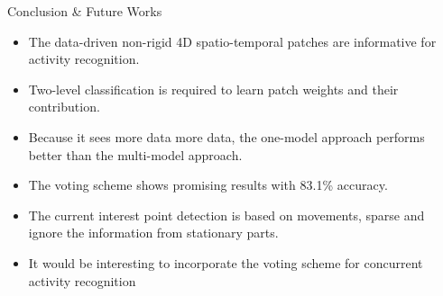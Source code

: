 \documentclass[final,hyperref={pdfpagelabels=false}]{beamer}
\begin{document}
\begin{frame}[t]
\begin{columns}[t]
\begin{column}{.465\textwidth}
\begin{block}{Conclusion \& Future Works}


\begin{itemize}
\item The data-driven non-rigid 4D spatio-temporal patches are informative for activity recognition.

\item Two-level classification is required to learn patch weights and their contribution.

\item Because it sees more data more data, the one-model approach performs better than the multi-model approach.

\item The voting scheme shows promising results with 83.1\% accuracy.

\item The current interest point detection is based on movements, sparse and ignore the information from stationary parts.

\item It would be interesting to incorporate the voting scheme for concurrent activity recognition

\end{itemize}

\end{block}


\end{column}
\end{columns}
\end{frame}
\end{document}
